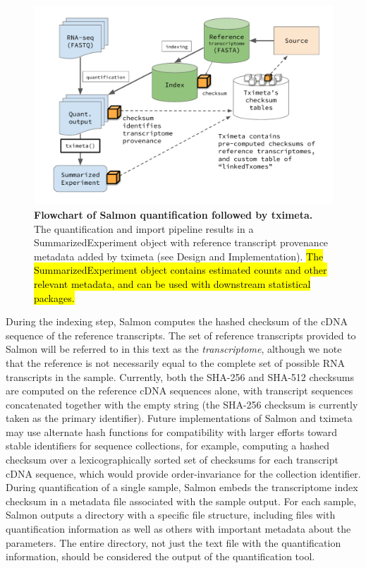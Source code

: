 \begin{figure}
  \centering
  \includegraphics[width=\textwidth]{diagram.pdf}
  \caption{
    {\bf Flowchart of Salmon quantification followed by tximeta.}
    The quantification and import pipeline results in a
    SummarizedExperiment object with reference transcript provenance
    metadata added by tximeta (see Design and Implementation).
    \hl{The SummarizedExperiment object contains estimated counts and
    other relevant metadata, and can be used with downstream
    statistical packages.}}
  \label{fig:diagram}
\end{figure}

During the indexing step, Salmon computes the hashed checksum of the
cDNA sequence of the reference transcripts. The set of reference
transcripts provided to Salmon will be referred to in this text as the
\textit{transcriptome}, although we note that the reference is not
necessarily equal to the complete set of possible RNA transcripts in
the sample. Currently, both the SHA-256 and SHA-512 \cite{sha1}
checksums are computed on the reference cDNA sequences alone, with
transcript sequences concatenated together with the empty string (the
SHA-256 checksum is currently taken as the primary identifier). Future
implementations of Salmon and tximeta may use alternate hash functions
for compatibility with larger efforts toward stable identifiers for
sequence collections, for example, computing a hashed checksum over a
lexicographically sorted set of checksums for each transcript cDNA
sequence, which would provide order-invariance for the collection
identifier. During quantification of a single sample, Salmon embeds
the transcriptome index checksum in a metadata file associated with
the sample output. For each sample, Salmon outputs a directory with a
specific file structure, including files with quantification
information as well as others with important metadata about the
parameters. The entire directory, not just the text file with the
quantification information, should be considered the output of
the quantification tool.

